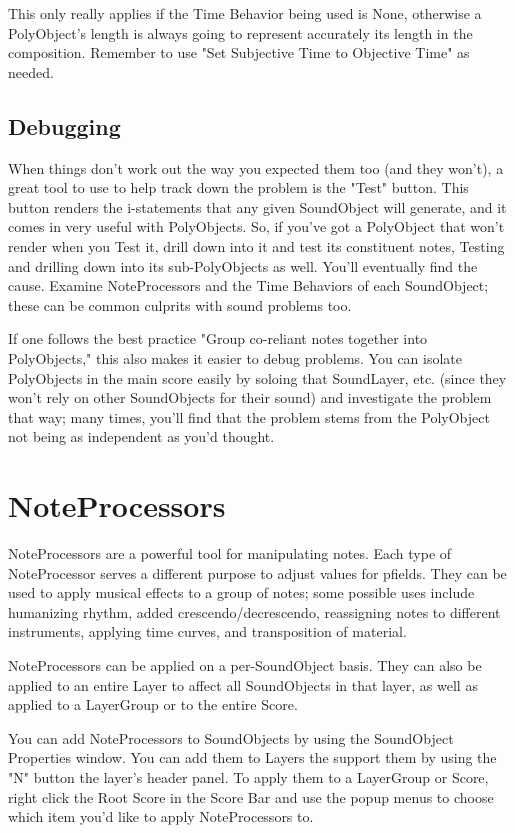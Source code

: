 This only really applies if the Time Behavior being used is None,
otherwise a PolyObject's length is always going to represent accurately
its length in the composition. Remember to use "Set Subjective Time to
Objective Time" as needed.

\subsection{Debugging}

When things don't work out the way you expected them too (and they
won't), a great tool to use to help track down the problem is the "Test"
button. This button renders the i-statements that any given SoundObject
will generate, and it comes in very useful with PolyObjects. So, if
you've got a PolyObject that won't render when you Test it, drill down
into it and test its constituent notes, Testing and drilling down into
its sub-PolyObjects as well. You'll eventually find the cause. Examine
NoteProcessors and the Time Behaviors of each SoundObject; these can be
common culprits with sound problems too.

If one follows the best practice "Group co-reliant notes together into
PolyObjects," this also makes it easier to debug problems. You can
isolate PolyObjects in the main score easily by soloing that SoundLayer,
etc. (since they won't rely on other SoundObjects for their sound) and
investigate the problem that way; many times, you'll find that the
problem stems from the PolyObject not being as independent as you'd
thought.

\section{NoteProcessors}\label{conceptsNoteProcessors}

NoteProcessors are a powerful tool for manipulating notes. Each type of
NoteProcessor serves a different purpose to adjust values for pfields.
They can be used to apply musical effects to a group of notes; some
possible uses include humanizing rhythm, added crescendo/decrescendo,
reassigning notes to different instruments, applying time curves, and
transposition of material.

NoteProcessors can be applied on a per-SoundObject basis. They can also
be applied to an entire Layer to affect all SoundObjects in that layer,
as well as applied to a LayerGroup or to the entire Score.

You can add NoteProcessors to SoundObjects by using the SoundObject
Properties window. You can add them to Layers the support them by using
the "N" button the layer's header panel. To apply them to a LayerGroup
or Score, right click the Root Score in the Score Bar and use the popup
menus to choose which item you'd like to apply NoteProcessors to.

